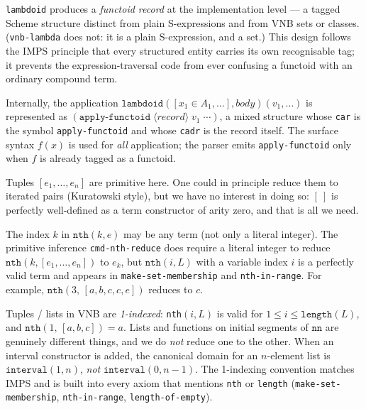 \begin{remark}
\texttt{lambdoid} produces a \emph{functoid record} at the implementation
level --- a tagged Scheme structure distinct from plain S-expressions and from
VNB sets or classes.  (\texttt{vnb-lambda} does not: it is a plain
S-expression, and a set.)  This design follows the IMPS
principle that every structured entity carries its own recognisable tag; it
prevents the expression-traversal code from ever confusing a functoid with an
ordinary compound term.

Internally, the application
$\texttt{lambdoid}([x_1 \in A_1,\ldots], \mathit{body})(v_1,\ldots)$
is represented as
$(\texttt{apply-functoid}\;\langle\textit{record}\rangle\;v_1\;\cdots)$,
a mixed structure whose \texttt{car} is the symbol \texttt{apply-functoid}
and whose \texttt{cadr} is the record itself.  The surface syntax
$f(x)$ is used for \emph{all} application; the parser emits
\texttt{apply-functoid} only when $f$ is already tagged as a functoid.
\end{remark}

\begin{remark}
Tuples $[e_1,\ldots,e_n]$ are primitive here.  One could in principle reduce
them to iterated pairs (Kuratowski style), but we have no interest in doing so:
$[\ ]$ is perfectly well-defined as a term constructor of arity zero, and that
is all we need.
\end{remark}

\begin{remark}
The index $k$ in $\texttt{nth}(k, e)$ may be any term (not only a literal
integer).  The primitive inference \texttt{cmd-nth-reduce} does require a
literal integer to reduce $\texttt{nth}(k, [e_1,\ldots,e_n])$ to $e_k$, but
$\texttt{nth}(i, L)$ with a variable index $i$ is a perfectly valid term and
appears in \texttt{make-set-membership} and \texttt{nth-in-range}.
For example, $\texttt{nth}(3,\,[a,b,c,c,e])$ reduces to $c$.
\end{remark}

\begin{remark}
Tuples / lists in VNB are \emph{1-indexed}: \texttt{nth}$(i, L)$ is valid
for $1 \le i \le \texttt{length}(L)$, and $\texttt{nth}(1,\,[a, b, c]) = a$.
Lists and functions on initial segments of $\mathtt{nn}$ are genuinely
different things, and we do \emph{not} reduce one to the other.  When an
interval constructor is added, the canonical domain for an $n$-element list
is $\mathtt{interval}(1, n)$, \emph{not} $\mathtt{interval}(0, n-1)$.
The 1-indexing convention matches IMPS and is built into every axiom
that mentions \texttt{nth} or \texttt{length} (\texttt{make-set-membership},
\texttt{nth-in-range}, \texttt{length-of-empty}).
\end{remark}

